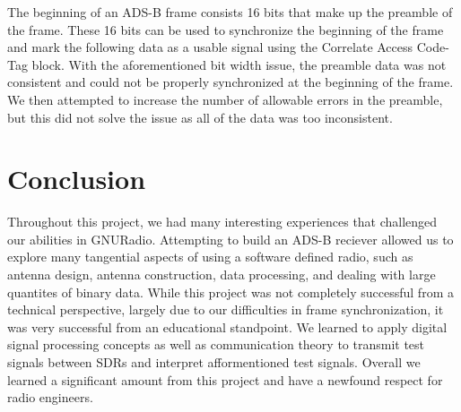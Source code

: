 \documentclass[conference, onecolumn]{IEEEtran}
\begin{document}
The beginning of an ADS-B frame consists 16 bits that make up the preamble of the frame. These 16 bits can be used to synchronize the beginning of the frame and mark the following data as a usable signal using the Correlate Access Code-Tag block. With the aforementioned bit width issue, the preamble data was not consistent and could not be properly synchronized at the beginning of the frame. We then attempted to increase the number of allowable errors in the preamble, but this did not solve the issue as all of the data was too inconsistent.


\section{Conclusion}
Throughout this project, we had many interesting experiences that challenged our abilities in GNURadio. Attempting to build an ADS-B reciever allowed us to explore many tangential aspects of using a software defined radio, such as antenna design, antenna construction, data processing, and dealing with large quantites of binary data. While this project was not completely successful from a technical perspective, largely due to our difficulties in frame synchronization, it was very successful from an educational standpoint. We learned to apply digital signal processing concepts as well as communication theory to transmit test signals between SDRs and interpret afformentioned test signals. Overall we learned a significant amount from this project and have a newfound respect for radio engineers.





\end{document}
